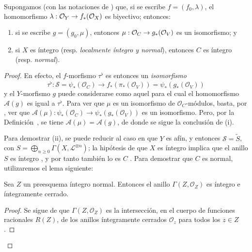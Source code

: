 \documentclass[oneside,10pt]{amsart}
\makeatletter
\newcommand{\ega@arrow}[2]{\mathchoice{#1}{#2}{#2}{#2}}
\renewcommand{\to}{\ega@arrow{\longrightarrow}{\rightarrow}}
\newcommand{\oldpage}[2][]{\marginnote{\normalfont\footnotesize\textbf{#1}~|~#2}\ignorespaces}
\let\EGAOriginalLabel\label
\renewcommand{\label}[1]{\phantomsection\EGAOriginalLabel{#1}}
\makeatother
\begin{document}
\begin{proposition}[8.8.6]
\label{II.8.8.6-fr}
Supongamos (con las notaciones de ) que, si se escribe $f=(f_0,\lambda)$, el homomorfismo $\lambda:\mathcal{O}_Y\to f_*(\mathcal{O}_X)$ es biyectivo;
entonces:
\begin{enumerate}
  \item[\rm{(i)}] si se escribe $g=(g_0,\mu)$, entonces $\mu:\mathcal{O}_C\to g_*(\mathcal{O}_V)$ es un isomorfismo; y
  \item[\rm{(ii)}] si $X$ es íntegro \textup{(resp. \emph{localmente íntegro y normal})}, entonces $C$ es íntegro \textup{(resp. \emph{normal})}.
\end{enumerate}
\end{proposition}

\begin{proof}
En efecto, el $f$-morfismo $\tau^\flat$ es entonces un \emph{isomorfismo}
\[
  \tau^\flat:\mathcal{S}=\psi_*(\mathcal{O}_C)
  \longrightarrow f_*(\pi_*(\mathcal{O}_V))
  =\psi_*(g_*(\mathcal{O}_V))
\]
y el $Y$-morfismo $g$ puede considerarse como aquel para el cual el homomorfismo $\mathcal{A}(g)$  es igual a $\tau^\flat$.
Para ver que $\mu$ es un isomorfismo de $\mathcal{O}_C$-módulos, basta, por , ver que $\mathcal{A}(\mu):\psi_*(\mathcal{O}_C)\longrightarrow\psi_*(g_*(\mathcal{O}_V))$ es un isomorfismo.
Pero, por la Definición~, se tiene $\mathcal{A}(\mu)=\mathcal{A}(g)$, de donde se sigue la conclusión de (i).

Para demostrar (ii), se puede reducir al caso en que $Y$ es afín, y entonces $\mathcal{S}=\widetilde{S}$, con
\oldpage[II]{182}
$S=\bigoplus_{n\geqslant 0}\Gamma(X,\mathcal{L}^{\otimes n})$;
la hipótesis de que $X$ es íntegro implica que el anillo $S$ es íntegro , y por tanto también lo es $C$ .
Para demostrar que $C$ es normal, utilizaremos el lema siguiente:

\begin{lemma}[8.8.6.1]
\label{II.8.8.6.1-fr}
Sea $Z$ un preesquema íntegro normal.
Entonces el anillo $\Gamma(Z,\mathcal{O}_Z)$ es íntegro e íntegramente cerrado.
\end{lemma}

\begin{proof}
Se sigue de  que $\Gamma(Z,\mathcal{O}_Z)$ es la intersección, en el cuerpo de funciones racionales $R(Z)$, de los anillos íntegramente cerrados $\mathcal{O}_z$ para todos los $z\in Z$.
\end{proof}


\end{proof}
\end{document}
